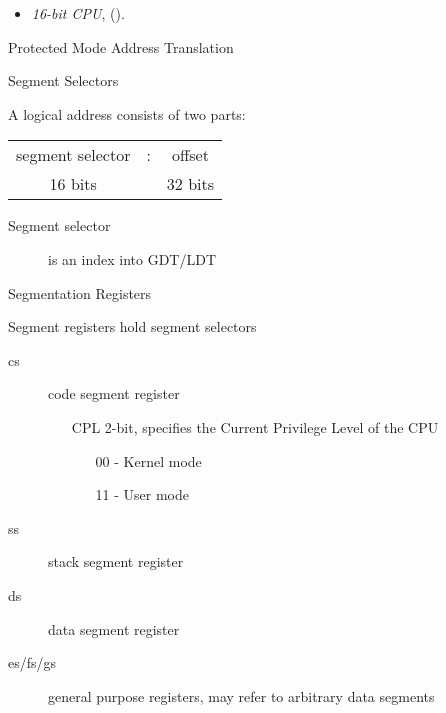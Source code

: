 \begin{itemize}
\item \emph{16-bit CPU}, (\cite[Sec 2.4]{wangshuang03}).
\end{itemize}

\begin{frame}{Protected Mode Address Translation}
  \begin{center}
  \end{center}
\end{frame}

\begin{frame}{Segment Selectors}
  \begin{block}{A logical address consists of two parts:}
    \begin{center}
      \begin{tabular}{ccc}
        segment selector&:&offset\\
        {\scriptsize 16 bits}&&{\scriptsize 32 bits}
      \end{tabular}
    \end{center}
  \end{block}
  \begin{description}
  \item[Segment selector] is an index into GDT/LDT
  \end{description}
  \begin{center}
     
  \end{center}
\end{frame}

\begin{frame}{Segmentation Registers}
  \begin{block}{Segment registers hold segment selectors}
    \begin{description}
    \item[cs] code segment register
      \begin{itemize}
      \item[CPL] 2-bit, specifies the Current Privilege Level of the CPU
        \begin{itemize}
        \item[00] - Kernel mode
        \item[11] - User mode
        \end{itemize}
      \end{itemize}
    \item[ss] stack segment register
    \item[ds] data segment register
    \item[es/fs/gs] general purpose registers, may refer to arbitrary data segments
    \end{description}
  \end{block}
\end{frame}

